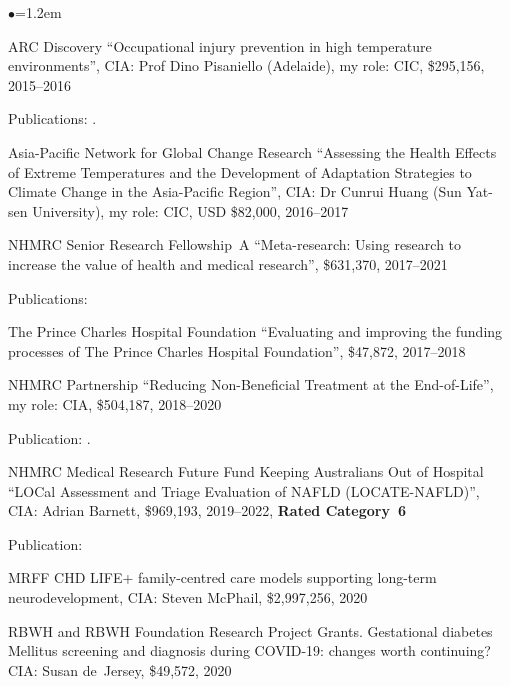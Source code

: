 \documentclass[a4paper,11pt]{article}
\renewcommand{\labelitemi}{$\bullet$}
\begin{document}
\begin{raggedright}
\begin{list}{\labelitemi}{\leftmargin=1.2em}
\item ARC Discovery ``Occupational injury prevention in high temperature environments'', CIA: Prof Dino Pisaniello (Adelaide), my role: CIC, \$295,156, 2015--2016

   Publications: .

\item Asia-Pacific Network for Global Change Research ``Assessing the Health Effects of Extreme Temperatures and the Development of
Adaptation Strategies to Climate Change in the Asia-Pacific Region'', CIA: Dr Cunrui Huang (Sun Yat-sen University), my role: CIC, USD \$82,000, 2016--2017

\item NHMRC Senior Research Fellowship~A ``Meta-research: Using research to increase the value of health and medical research'', \$631,370, 2017--2021

   Publications: 

\item The Prince Charles Hospital Foundation ``Evaluating and improving the funding processes of The Prince Charles Hospital Foundation'', \$47,872, 2017--2018

\item NHMRC Partnership ``Reducing Non-Beneficial Treatment at the End-of-Life'', my role: CIA, \$504,187, 2018--2020

Publication: .

\item NHMRC Medical Research Future Fund Keeping Australians Out of Hospital ``LOCal Assessment and Triage Evaluation of NAFLD (LOCATE-NAFLD)'', CIA: Adrian Barnett, \$969,193, 2019--2022, \textbf{Rated Category~6}

Publication: 

\item MRFF CHD LIFE+ family-centred care models supporting long-term neurodevelopment, CIA: Steven McPhail, \$2,997,256, 2020

\item RBWH and RBWH Foundation Research Project Grants. Gestational diabetes Mellitus screening and diagnosis during COVID-19: changes worth continuing? CIA: Susan de~Jersey, \$49,572, 2020


\end{list}
\end{raggedright}
\end{document}
